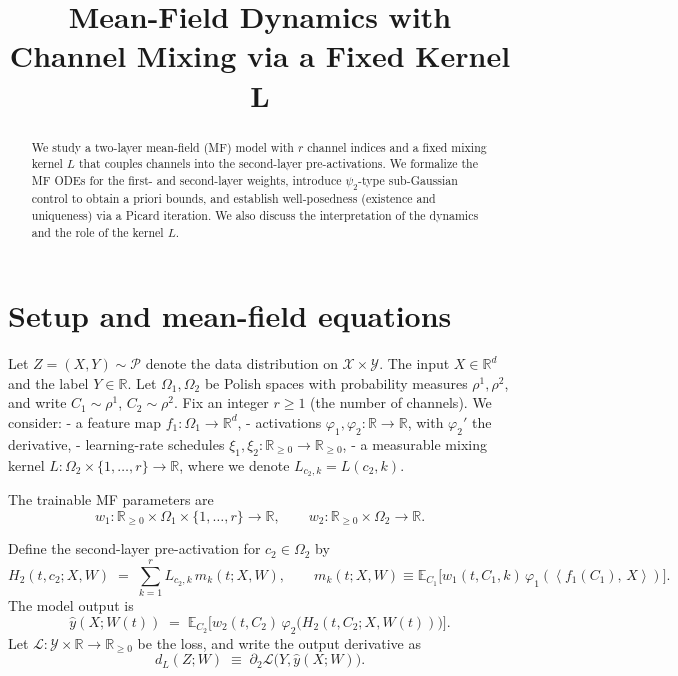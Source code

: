 \documentclass[11pt]{article}
\title{Mean-Field Dynamics with Channel Mixing via a Fixed Kernel L}
\author{ }
\date{}
\newcommand{\E}{\mathbb{E}}
\newcommand{\R}{\mathbb{R}}
\newcommand{\1}{\mathbbm{1}}
\newcommand{\ip}[2]{\left\langle #1,\,#2 \right\rangle}
\begin{document}
\maketitle

\begin{abstract}
We study a two-layer mean-field (MF) model with $r$ channel indices and a fixed mixing kernel $L$ that couples channels into the second-layer pre-activations. We formalize the MF ODEs for the first- and second-layer weights, introduce $\psi_2$-type sub-Gaussian control to obtain a priori bounds, and establish well-posedness (existence and uniqueness) via a Picard iteration. We also discuss the interpretation of the dynamics and the role of the kernel $L$.
\end{abstract}

\section{Setup and mean-field equations}

Let $Z=(X,Y)\sim\mathcal{P}$ denote the data distribution on $\mathcal{X}\times \mathcal{Y}$. The input $X\in\R^d$ and the label $Y\in\R$. Let $\Omega_1,\Omega_2$ be Polish spaces with probability measures $\rho^1,\rho^2$, and write $C_1\sim\rho^1$, $C_2\sim\rho^2$. Fix an integer $r\ge 1$ (the number of channels). We consider:
- a feature map $f_1:\Omega_1\to\R^d$,
- activations $\varphi_1,\varphi_2:\R\to\R$, with $\varphi_2'$ the derivative,
- learning-rate schedules $\xi_1,\xi_2:\R_{\ge 0}\to\R_{\ge 0}$,
- a measurable mixing kernel $L:\Omega_2\times\{1,\dots,r\}\to\R$, where we denote $L_{c_2,k}=L(c_2,k)$.

The trainable MF parameters are
\[
w_1:\R_{\ge 0}\times \Omega_1\times\{1,\dots,r\}\to\R,\qquad
w_2:\R_{\ge 0}\times \Omega_2\to\R.
\]

Define the second-layer pre-activation for $c_2\in\Omega_2$ by
\begin{equation}\label{eq:H2-def}
H_2(t,c_2;X,W)\;=\;\sum_{k=1}^r L_{c_2,k}\, m_k(t;X,W),\qquad
m_k(t;X,W)\equiv \E_{C_1}\big[w_1(t,C_1,k)\,\varphi_1(\ip{f_1(C_1)}{X})\big].
\end{equation}
The model output is
\begin{equation}\label{eq:yhat-def}
\hat y(X;W(t)) \;=\; \E_{C_2}\big[w_2(t,C_2)\,\varphi_2\big(H_2(t,C_2;X,W(t))\big)\big].
\end{equation}
Let $\mathcal{L}:\mathcal{Y}\times\R\to\R_{\ge 0}$ be the loss, and write the output derivative as
\begin{equation}\label{eq:dL-def}
d_L(Z;W)\;\equiv\;\partial_2 \mathcal{L}\big(Y,\hat y(X;W)\big).
\end{equation}
\end{document}
